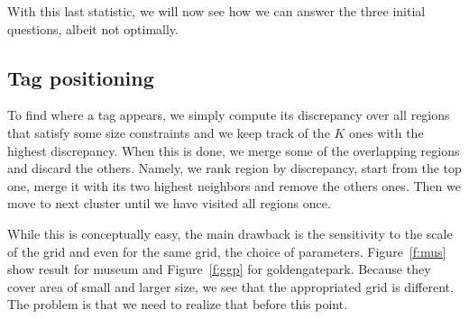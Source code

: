 With this last statistic, we will now see how we can answer the three initial
questions, albeit not optimally.

\subsection{Tag positioning}

To find where a tag appears, we simply compute its discrepancy over all
regions that satisfy some size constraints and we keep track of the $K$ ones
with the highest discrepancy. When this is done, we merge some of the
overlapping regions and discard the others. Namely, we rank region by
discrepancy, start from the top one, merge it with its two highest neighbors
and remove the others ones. Then we move to next cluster until we have visited
all regions once.

While this is conceptually easy, the main drawback is the sensitivity to the
scale of the grid and even for the same grid, the choice of parameters.
Figure~\vref{f:mus} show result for \textsf{museum} and Figure~\vref{f:ggp}
for \textsf{goldengatepark}. Because they cover area of small and larger size,
we see that the appropriated grid is different. The problem is that we need to
realize that before this point.

